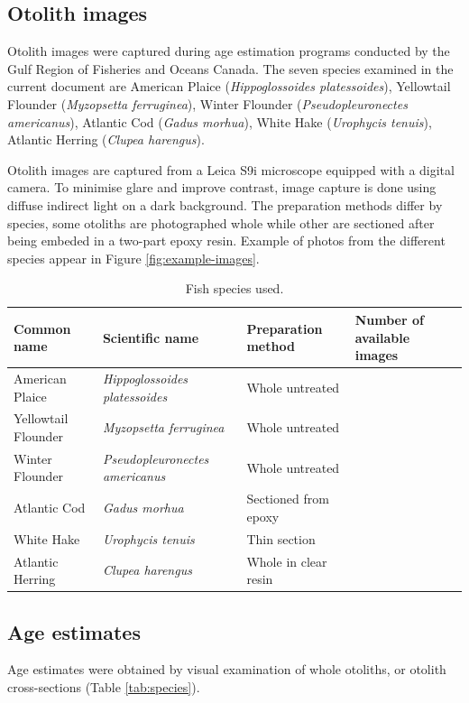 
\subsection{Otolith images}

Otolith images were captured during age estimation programs conducted by the Gulf Region of Fisheries and Oceans Canada.
The seven species examined in the current document are American Plaice (\emph{Hippoglossoides platessoides}), Yellowtail Flounder (\emph{Myzopsetta ferruginea}), Winter Flounder (\emph{Pseudopleuronectes americanus}), Atlantic Cod (\emph{Gadus morhua}), White Hake (\emph{Urophycis tenuis}), Atlantic Herring (\emph{Clupea harengus}).

Otolith images are captured from a Leica S9i microscope equipped with a digital camera.
To minimise glare and improve contrast, image capture is done using diffuse indirect light on a dark background.
The preparation methods differ by species, some otoliths are photographed whole while other are sectioned after being embeded in a two-part epoxy resin.
Example of photos from the different species appear in Figure \ref{fig:example-images}.

\begin{table}\caption{Fish species used.}
\begin{tabular}{p{4cm}p{4cm}p{4cm}p{3cm}}
Common name & Scientific name & Preparation method & Number of available images\\
\hline
American Plaice & \emph{Hippoglossoides platessoides} & Whole untreated & \\
Yellowtail Flounder &  \emph{Myzopsetta ferruginea} & Whole untreated & \\
Winter Flounder &  \emph{Pseudopleuronectes americanus} & Whole untreated & \\
Atlantic Cod &  \emph{Gadus morhua} & Sectioned from epoxy & \\
White Hake &  \emph{Urophycis tenuis} & Thin section \\
Atlantic Herring &  \emph{Clupea harengus} & Whole in clear resin \\
\end{tabular}
\end{table}\label{tab:species}


\subsection{Age estimates}

Age estimates were obtained by visual examination of whole otoliths, or otolith cross-sections (Table \ref{tab:species}).


